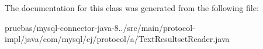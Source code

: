 The documentation for this class was generated from the following file\+:\begin{DoxyCompactItemize}
\item 
pruebas/mysql-\/connector-\/java-\/8../src/main/protocol-\/impl/java/com/mysql/cj/protocol/a/Text\+Resultset\+Reader.\+java\end{DoxyCompactItemize}
